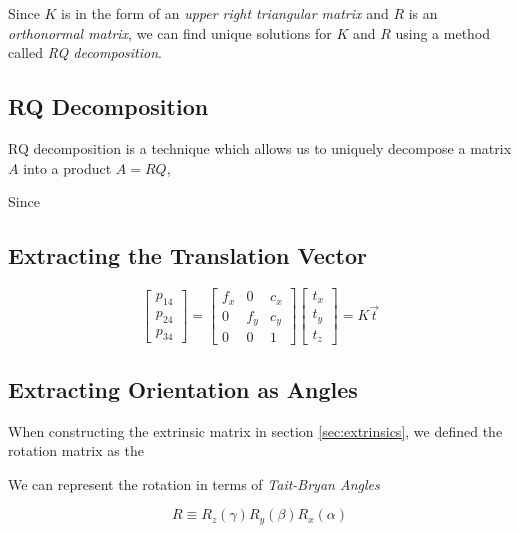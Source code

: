 Since $K$ is in the form of an \emph{upper right triangular matrix} and $R$ is an \emph{orthonormal matrix}, we can find unique solutions for $K$ and $R$ using a method called \emph{RQ decomposition}.

\subsection{RQ Decomposition}

RQ decomposition is a technique which allows us to uniquely decompose a matrix $A$ into a product $A=RQ$,

Since

\subsection{Extracting the Translation Vector}

\begin{equation}
    \begin{bmatrix}
        p_{14} \\ p_{24} \\ p_{34}
    \end{bmatrix}
    =
    \begin{bmatrix}
        f_x & 0   & c_x \\
        0   & f_y & c_y \\
        0   & 0   & 1
    \end{bmatrix}
    \begin{bmatrix}
        t_x \\ t_y \\ t_z
    \end{bmatrix}
    =K\vec{t}
\end{equation}

\subsection{Extracting Orientation as Angles}

When constructing the extrinsic matrix in section \ref{sec:extrinsics}, we defined the rotation matrix as the 

We can represent the rotation in terms of \emph{Tait-Bryan Angles}

\begin{equation}
    R \equiv R_z(\gamma)R_y(\beta)R_x(\alpha)
\end{equation}

